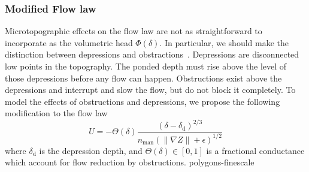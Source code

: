 \documentclass[review,11pt]{elsarticle}
\begin{document}
\subsubsection{Modified Flow law}
Microtopographic effects on the flow law are not as straightforward to incorporate as the volumetric head $\Phi(\delta)$. In particular, we should make the distinction between depressions and obstractions~\cite{panday2004fully}. Depressions are disconnected low points in the topography. The ponded depth must rise above the level of those depressions before any flow can happen. Obstructions exist above the depressions and interrupt and slow the flow, but do not block it completely.
To model the effects of obstructions and depressions, we propose the following modification to the flow law
\begin{equation}\label{modified-velocity}
U = - \Theta(\delta) \frac{(\delta - \delta_\text{d})^{2/3}}{n_\text{man} (\| \nabla Z \| +\epsilon)^{1/2}}
\end{equation}
where $\delta_\text{d}$ is the depression depth, and $\Theta(\delta) \in [0,1]$ is a fractional conductance which account for flow reduction by obstructions.
polygons-finescale

\end{document}
